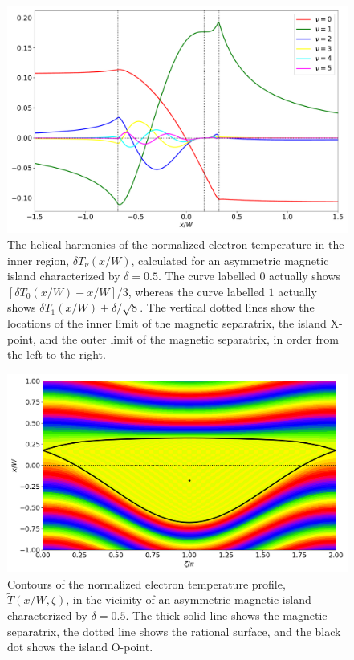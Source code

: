 \documentclass[12pt,prb,aps]{revtex4-1}
\begin{document}
\begin{figure}
\centerline{\includegraphics[width=\textwidth]{dTh.pdf}}
\caption{The helical harmonics of the normalized electron temperature  in the inner region, $\delta T_\nu(x/W)$, calculated for an asymmetric
magnetic island characterized by $\delta=0.5$.  The curve labelled $0$ actually shows $[\delta T_0(x/W)-x/W]/3$, whereas the
curve labelled  $1$ actually
shows $\delta T_1(x/W) +  \delta/\sqrt{8}$. The vertical dotted lines show the locations of the inner limit of the magnetic separatrix,
the island X-point, and the outer limit of the magnetic separatrix, in order from the left to the right.\label{fig4}}
\end{figure}

\begin{figure}
\centerline{\includegraphics[width=\textwidth]{dTe.png}}
\caption{Contours of the normalized electron temperature profile, $\tilde{T}(x/W,\zeta)$, in the vicinity of an asymmetric magnetic island  characterized by
$\delta = 0.5$. The thick solid line shows the magnetic separatrix, the dotted line shows the rational surface, and the black dot shows the
island O-point.\label{fig5}}
\end{figure}
\end{document}
